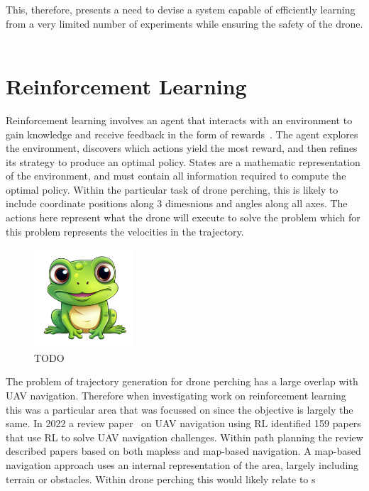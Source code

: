 This, therefore, presents a need to devise a system capable of efficiently learning from a very limited number of experiments while ensuring the safety of the drone. \\\\

\section{Reinforcement Learning}
Reinforcement learning involves an agent that interacts with an environment to gain knowledge and receive feedback in the form of rewards~\cite{rlIntroSuttonBarlo}.
The agent explores the environment, discovers which actions yield the most reward, and then refines its strategy to produce an optimal policy.
States are a mathematic representation of the environment, and must contain all information required to compute the optimal policy.
Within the particular task of drone perching, this is likely to include coordinate positions along 3 dimesnions and angles along all axes.
The actions here represent what the drone will execute to solve the problem which for this problem represents the velocities in the trajectory.

\begin{figure}[htbp]
  \centering
  \includegraphics[width=0.33\textwidth]{frog.png}
  \caption{TODO}
\label{fig:rl-intro-drone}
\end{figure}

The problem of trajectory generation for drone perching has a large overlap with UAV navigation.
Therefore when investigating work on reinforcement learning this was a particular area that was focussed on since the objective is largely the same.
In 2022 a review paper~\cite{aerialNavReview} on UAV navigation using RL identified 159 papers that use RL to solve UAV navigation challenges.
Within path planning the review described papers based on both mapless and map-based navigation.
A map-based navigation approach uses an internal representation of the area, largely including terrain or obstacles.
Within drone perching this would likely relate to s 

